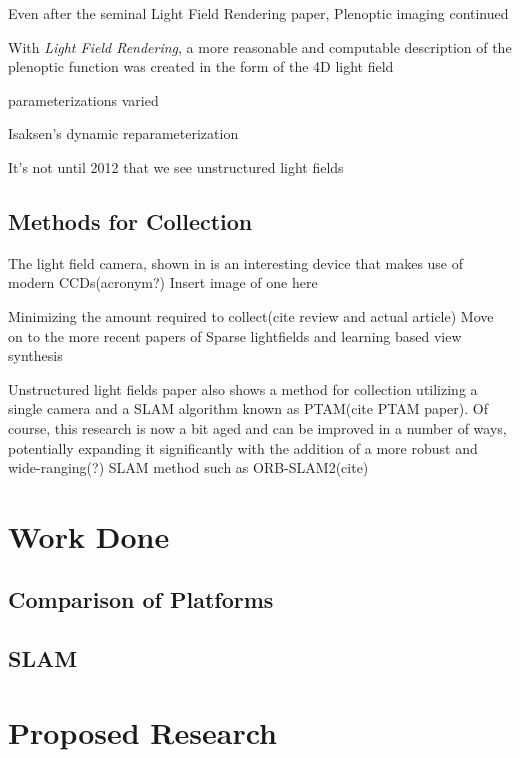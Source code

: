 \documentclass[12pt]{report}
\begin{document}
Even after the seminal Light Field Rendering paper, Plenoptic imaging continued

With \emph{Light Field Rendering}, a more reasonable and computable description of the plenoptic function was created in the form of the 4D light field

parameterizations varied

Isaksen's dynamic reparameterization

It's not until 2012 that we see unstructured light fields

\section*{Methods for Collection}
The light field camera, shown in \cite{Ng06} is an interesting device that makes use of modern CCDs(acronym?)
Insert image of one here

Minimizing the amount required to collect(cite review and actual article)
Move on to the more recent papers of Sparse lightfields and learning 
based view synthesis

Unstructured light fields paper also shows a method for collection utilizing a single camera and a SLAM algorithm known as PTAM(cite PTAM paper). Of course, this research is now a bit aged and can be improved in a number of ways, potentially expanding it significantly with the addition of a more robust and wide-ranging(?) SLAM method such as ORB-SLAM2(cite)


\chapter{Work Done}
\section{Comparison of Platforms}
\section{SLAM}

\chapter{Proposed Research}
\end{document}
